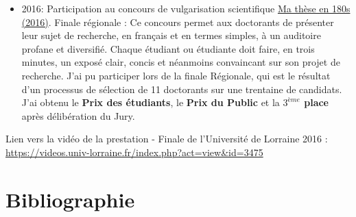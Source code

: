 \documentclass[
  11pt,
]{article}
\providecommand{\tightlist}{%
  \setlength{\itemsep}{0pt}\setlength{\parskip}{0pt}}\usepackage{longtable,booktabs,array}
\begin{document}
\begin{itemize}
\tightlist
\item
  2016: Participation au concours de vulgarisation scientifique
  \href{http://videos.univ-lorraine.fr/index.php?act=view\&id=3475}{Ma
  thèse en 180s (2016)}. Finale régionale : Ce concours permet aux
  doctorants de présenter leur sujet de recherche, en français et en
  termes simples, à un auditoire profane et diversifié. Chaque étudiant
  ou étudiante doit faire, en trois minutes, un exposé clair, concis et
  néanmoins convaincant sur son projet de recherche. J'ai pu participer
  lors de la finale Régionale, qui est le résultat d'un processus de
  sélection de 11 doctorants sur une trentaine de candidats. J'ai obtenu
  le \textbf{Prix des étudiants}, le \textbf{Prix du Public} et la
  \textbf{\(3^{ème}\) place} après délibération du Jury.
\end{itemize}

Lien vers la vidéo de la prestation - Finale de l'Université de Lorraine
2016 : \url{https://videos.univ-lorraine.fr/index.php?act=view&id=3475}

\newpage

\hypertarget{bibliographie}{%
\section{Bibliographie}\label{bibliographie}}
\end{document}

